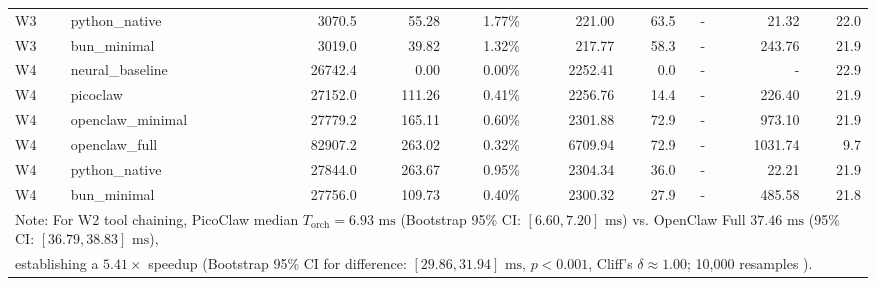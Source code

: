 \begin{table}[t]
\begin{tabular}{llrrrrrrrr}
W3 & python\_native & 3070.5 & 55.28 & 1.77\% & 221.00 & 63.5 & - & 21.32 & 22.0 \\
W3 & bun\_minimal & 3019.0 & 39.82 & 1.32\% & 217.77 & 58.3 & - & 243.76 & 21.9 \\
\midrule
W4 & neural\_baseline & 26742.4 & 0.00 & 0.00\% & 2252.41 & 0.0 & - & - & 22.9 \\
W4 & picoclaw & 27152.0 & 111.26 & 0.41\% & 2256.76 & 14.4 & - & 226.40 & 21.9 \\
W4 & openclaw\_minimal & 27779.2 & 165.11 & 0.60\% & 2301.88 & 72.9 & - & 973.10 & 21.9 \\
W4 & openclaw\_full & 82907.2 & 263.02 & 0.32\% & 6709.94 & 72.9 & - & 1031.74 & 9.7 \\
W4 & python\_native & 27844.0 & 263.67 & 0.95\% & 2304.34 & 36.0 & - & 22.21 & 21.9 \\
W4 & bun\_minimal & 27756.0 & 109.73 & 0.40\% & 2300.32 & 27.9 & - & 485.58 & 21.8 \\
\midrule
\multicolumn{10}{l}{\footnotesize Note: For W2 tool chaining, PicoClaw median $T_{\text{orch}} = 6.93\text{ ms}$ (Bootstrap 95\% CI: $[6.60, 7.20]\text{ ms}$) vs. OpenClaw Full $37.46\text{ ms}$ (95\% CI: $[36.79, 38.83]\text{ ms}$),} \\
\multicolumn{10}{l}{\footnotesize establishing a $5.41\times$ speedup (Bootstrap 95\% CI for difference: $[29.86, 31.94]\text{ ms}$, $p < 0.001$, Cliff's $\delta \approx 1.00$; 10,000 resamples \cite{efron1979}).} \\
\bottomrule
\end{tabular}
\end{table}
